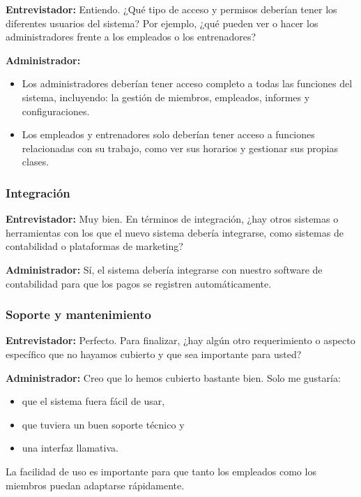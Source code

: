 \documentclass[spanish,12pt]{article}
\providecommand{\tightlist}{\setlength{\itemsep}{0pt}\setlength{\parskip}{0pt}}
\begin{document}
\textbf{Entrevistador:} Entiendo. ¿Qué tipo de acceso y permisos
deberían tener los diferentes usuarios del sistema? Por ejemplo, ¿qué
pueden ver o hacer los administradores frente a los empleados o los
entrenadores?

\textbf{Administrador:}

\begin{itemize}
\tightlist
\item
  Los administradores deberían tener acceso completo a todas las
  funciones del sistema, incluyendo: la gestión de miembros, empleados,
  informes y configuraciones.
\item
  Los empleados y entrenadores solo deberían tener acceso a funciones
  relacionadas con su trabajo, como ver sus horarios y gestionar sus
  propias clases.
\end{itemize}

\subsubsection{Integración}\label{integraciuxf3n}

\textbf{Entrevistador:} Muy bien. En términos de integración, ¿hay otros
sistemas o herramientas con los que el nuevo sistema debería integrarse,
como sistemas de contabilidad o plataformas de marketing?

\textbf{Administrador:} Sí, el sistema debería integrarse con nuestro
software de contabilidad para que los pagos se registren
automáticamente.

\subsubsection{Soporte y mantenimiento}\label{soporte-y-mantenimiento}

\textbf{Entrevistador:} Perfecto. Para finalizar, ¿hay algún otro
requerimiento o aspecto específico que no hayamos cubierto y que sea
importante para usted?

\textbf{Administrador:} Creo que lo hemos cubierto bastante bien. Solo
me gustaría:

\begin{itemize}
\tightlist
\item
  que el sistema fuera fácil de usar,
\item
  que tuviera un buen soporte técnico y
\item
  una interfaz llamativa.
\end{itemize}

La facilidad de uso es importante para que tanto los empleados como los
miembros puedan adaptarse rápidamente.
\end{document}
